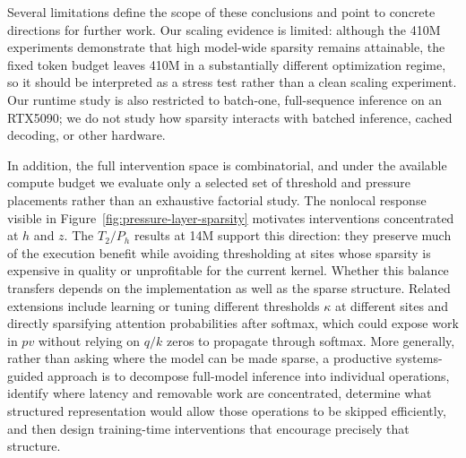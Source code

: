 Several limitations define the scope of these conclusions and point to concrete directions for further work. Our scaling evidence is limited: although the 410M experiments demonstrate that high model-wide sparsity remains attainable, the fixed token budget leaves 410M in a substantially different optimization regime, so it should be interpreted as a stress test rather than a clean scaling experiment. Our runtime study is also restricted to batch-one, full-sequence inference on an RTX5090; we do not study how sparsity interacts with batched inference, cached decoding, or other hardware.

In addition, the full intervention space is combinatorial, and under the available compute budget we evaluate only a selected set of threshold and pressure placements rather than an exhaustive factorial study. The nonlocal response visible in Figure~\ref{fig:pressure-layer-sparsity} motivates interventions concentrated at $h$ and $z$. The $T_2/P_h$ results at 14M support this direction: they preserve much of the execution benefit while avoiding thresholding at sites whose sparsity is expensive in quality or unprofitable for the current kernel. Whether this balance transfers depends on the implementation as well as the sparse structure. Related extensions include learning or tuning different thresholds $\kappa$ at different sites and directly sparsifying attention probabilities after softmax, which could expose work in $pv$ without relying on $q/k$ zeros to propagate through softmax. More generally, rather than asking where the model can be made sparse, a productive systems-guided approach is to decompose full-model inference into individual operations, identify where latency and removable work are concentrated, determine what structured representation would allow those operations to be skipped efficiently, and then design training-time interventions that encourage precisely that structure.